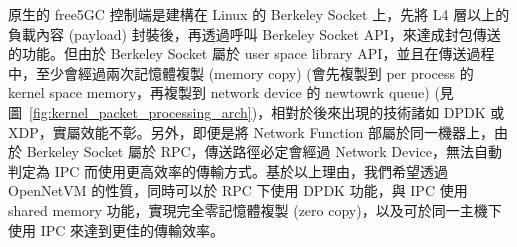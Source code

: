 原生的 free5GC 控制端是建構在 Linux 的 Berkeley Socket 上，先將 L4 層以上的負載內容 (payload) 封裝後，再透過呼叫 Berkeley Socket API，來達成封包傳送的功能。但由於 Berkeley Socket 屬於 user space library API，並且在傳送過程中，至少會經過兩次記憶體複製 (memory copy) (會先複製到 per process 的 kernel space memory，再複製到 network device 的 newtowrk queue) (見圖~\ref{fig:kernel_packet_processing_arch})，相對於後來出現的技術諸如 DPDK 或 XDP，實屬效能不彰。另外，即便是將 Network Function 部屬於同一機器上，由於 Berkeley Socket 屬於 RPC，傳送路徑必定會經過 Network Device，無法自動判定為 IPC 而使用更高效率的傳輸方式。基於以上理由，我們希望透過 OpenNetVM 的性質，同時可以於 RPC 下使用 DPDK 功能，與 IPC 使用 shared memory 功能，實現完全零記憶體複製 (zero copy)，以及可於同一主機下使用 IPC 來達到更佳的傳輸效率。

\begin{figure}[htbp]
  \centering
\end{figure}
